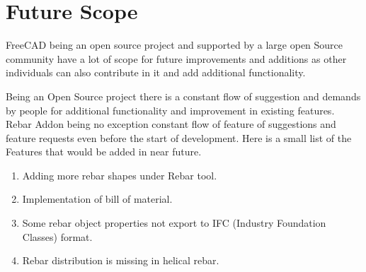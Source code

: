 \section{Future Scope}
FreeCAD being an open source project and supported by a large open Source community have a lot of scope for future improvements and additions as other individuals can also contribute in it and add additional functionality.

Being an Open Source project there is a constant flow of suggestion and demands by people for additional functionality and improvement in existing features.
Rebar Addon being no exception constant flow of feature of suggestions and feature requests even before the start of development. Here is a small list of the Features that would be added in near future.

\begin{enumerate}

\item Adding more rebar shapes under Rebar tool.
\item Implementation of bill of material.
\item Some rebar object properties not export to IFC (Industry Foundation Classes) format.
\item Rebar distribution is missing in helical rebar.
\end{enumerate}
